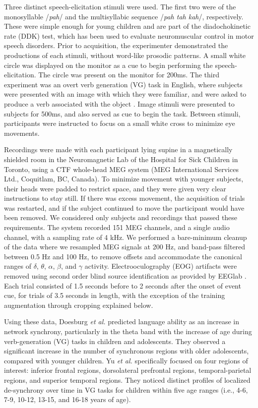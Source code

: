 \documentclass[fleqn,10pt]{wlscirep}
\begin{document}
Three distinct speech-elicitation stimuli were used. The first two were of the monosyllable /{\em pah}/ and the multisyllabic sequence /{\em pah tah kah}/, respectively. These were simple enough for young children and are part of the diadochokinetic rate (DDK) test, which has been used to evaluate neuromuscular control in motor speech disorders. Prior to acquisition, the experimenter demonstrated the productions of each stimuli, without word-like prosodic patterns. A small white circle was displayed on the monitor as a cue to begin performing the speech-elicitation. The circle was present on the monitor for 200ms. The third experiment was an overt verb generation (VG) task in English, where subjects were presented with an image with which they were familiar, and were asked to produce a verb associated with the object \cite{Doesburg2016}. Image stimuli were presented to subjects for 500ms, and also served as cue to begin the task. Between stimuli, participants were instructed to focus on a small white cross to minimize eye movements.

Recordings were made with each participant lying supine in a magnetically shielded room in the Neuromagnetic Lab of the Hospital for Sick Children in Toronto, using a CTF whole-head MEG system (MEG International Services Ltd., Coquitlam, BC, Canada). To minimize movement with younger subjects, their heads were padded to restrict space, and they were given very clear instructions to stay still. If there was excess movement, the acquisition of trials was restarted, and if the subject continued to move the participant would have been removed. We considered only subjects and recordings that passed these requirements. The system recorded 151 MEG channels, and a single audio channel, with a sampling rate of 4 kHz. We performed a bare-minimum cleanup of the data where we resampled MEG signals at 200 Hz, and band-pass filtered between 0.5 Hz and 100 Hz, to remove offsets and accommodate the canonical ranges of $\delta$, $\theta$, $\alpha$, $\beta$, and $\gamma$ activity. Electrooculography (EOG) artifacts were removed using second order blind source identification as provided by EEGlab \cite{Delorme04eeglab}. Each trial consisted of 1.5 seconds before to 2 seconds after the onset of event cue, for trials of 3.5 seconds in length, with the exception of the training augmentation through cropping explained below.

Using these data, Doesburg {\em et al.} \cite{Doesburg2016} predicted language ability as an increase in network synchrony, particularly in the theta band with the increase of age during verb-generation (VG) tasks in children and adolescents. They observed a significant increase in the number of synchronous regions with older adolescents, compared with younger children. Yu {\em et al.} \cite{Yu2014} specifically focused on four regions of interest: inferior frontal regions, dorsolateral prefrontal regions, temporal-parietal regions, and superior temporal regions. They noticed distinct profiles of localized de-synchrony over time in VG tasks for children within five age ranges (i.e., 4-6, 7-9, 10-12, 13-15, and 16-18 years of age).
\end{document}
